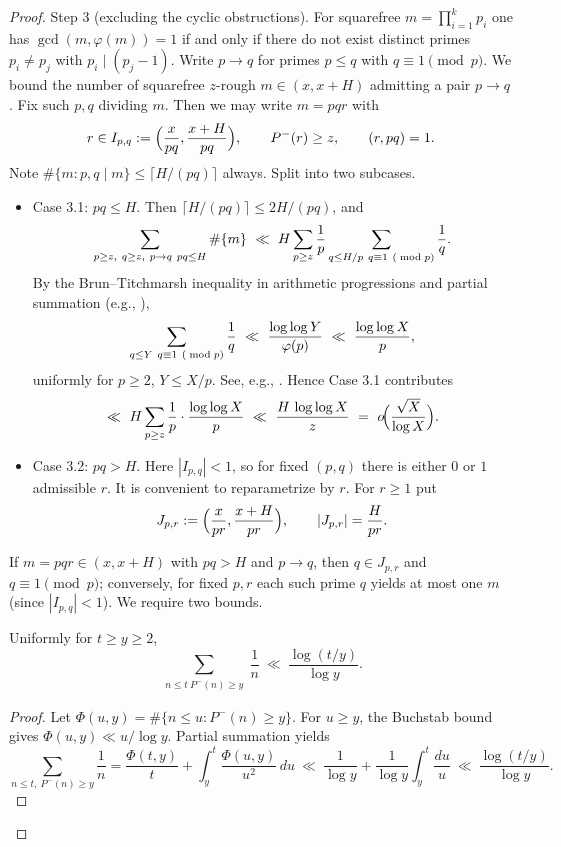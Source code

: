 \begin{proof}
Step 3 (excluding the cyclic obstructions). For squarefree $m=\prod_{i=1}^k p_i$ one has $\gcd(m,\varphi(m))=1$ if and only if there do not exist distinct primes $p_i\ne p_j$ with $p_i\mid(p_j-1)$. Write $p\to q$ for primes $p\le q$ with $q\equiv1\pmod p$. We bound the number of squarefree $z$-rough $m\in(x,x+H)$ admitting a pair $p\to q$.
Fix such $p,q$ dividing $m$. Then we may write $m=pqr$ with
\[
r\in I_{p,q}:=\Bigl({x\over pq},{x+H\over pq}\Bigr),\qquad P^-(r)\ge z,\qquad (r,pq)=1.
\]
Note $\#\{m: p,q\mid m\}\le \lceil H/(pq)\rceil$ always. Split into two subcases.
\begin{itemize}
\item Case 3.1: $pq\le H$. Then $\lceil H/(pq)\rceil\le 2H/(pq)$, and
\[
\sum_{\substack{p\ge z,\ q\ge z,\ p\to q\ pq\le H}}\#\{m\}
\ \ll\ H\sum_{p\ge z}{1\over p}\sum_{\substack{q\le H/p\ q\equiv1\ (\bmod p)}}{1\over q}.
\]
By the Brun--Titchmarsh inequality in arithmetic progressions and partial summation (e.g., \cite{MV2007,IK2004}),
\[
\sum_{\substack{q\le Y\ q\equiv1\ (\bmod p)}}{1\over q}\ \ll\ {\log\log Y\over \varphi(p)}\ \ll\ {\log\log X\over p},
\]
uniformly for $p\ge2$, $Y\le X/p$. See, e.g., \cite{MV2007,IK2004}.
Hence Case 3.1 contributes
\[
\ll\ H\sum_{p\ge z}{1\over p}\cdot{\log\log X\over p}\ \ll\ {H\,\log\log X\over z}
\ =\ o\!\Bigl({\sqrt X\over\log X}\Bigr).
\]
\item Case 3.2: $pq>H$. Here $|I_{p,q}|<1$, so for fixed $(p,q)$ there is either $0$ or $1$ admissible $r$. It is convenient to reparametrize by $r$. For $r\ge1$ put
\[
J_{p,r}:=\Bigl({x\over pr},{x+H\over pr}\Bigr),\qquad |J_{p,r}|={H\over pr}.
\]
\end{itemize}
If $m=pqr\in(x,x+H)$ with $pq>H$ and $p\to q$, then $q\in J_{p,r}$ and $q\equiv1\pmod p$; conversely, for fixed $p,r$ each such prime $q$ yields at most one $m$ (since $|I_{p,q}|<1$).
We require two bounds.
\begin{lemma}\label{lem:buchstab}
Uniformly for $t\ge y\ge2$,
\[
\sum_{\substack{n\le t\ P^-(n)\ge y}}\frac{1}{n}\ \ll\ \frac{\log(t/y)}{\log y}.
\]
\end{lemma}
\begin{proof}
Let $\Phi(u,y)=\#\{n\le u: P^-(n)\ge y\}$. For $u\ge y$, the Buchstab bound gives $\Phi(u,y)\ll u/\log y$. Partial summation yields
\[
\sum_{n\le t,\ P^-(n)\ge y}\frac{1}{n}=\frac{\Phi(t,y)}{t}+\int_y^t\frac{\Phi(u,y)}{u^2}\,du\ \ll\ \frac1{\log y}+\frac1{\log y}\int_y^t\frac{du}{u}\ \ll\ \frac{\log(t/y)}{\log y}.
\]
\end{proof}

\end{proof}
